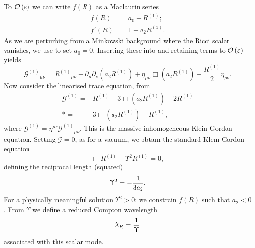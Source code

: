 To $\mathcal{O}\left({\varepsilon}\right)$ we can write $f(R)$ as a Maclaurin series
\begin{subequations}
\begin{align}
f(R) = {} & a_0 + R^{(1)}; \\
f'(R) = {} & 1 + a_2 R^{(1)}.
\end{align}
\end{subequations}
As we are perturbing from a Minkowski background where the Ricci scalar vanishes, we use  to set $a_0 = 0$. Inserting these into  and retaining terms to $\mathcal{O}\left({\varepsilon}\right)$ yields
\begin{equation}
{\mathcal{G}^{(1)}}_{\mu\nu} = {R^{(1)}}_{\mu\nu} - \partial_\mu\partial_\nu(a_2 R^{(1)}) + \eta_{\mu\nu}\Box(a_2 R^{(1)}) - \dfrac{R^{(1)}}{2}\eta_{\mu\nu}.
\label{eq:Field}
\end{equation}
Now consider the linearised trace equation, from 
\begin{align}
\mathcal{G}^{(1)} = {} & R^{(1)} + 3 \Box(a_2 R^{(1)}) - 2 R^{(1)} \nonumber \\*
 = {} & 3 \Box(a_2 R^{(1)}) - R^{(1)},
\label{eq:Box_R}
\end{align}
where $\mathcal{G}^{(1)} = \eta^{\mu\nu}{\mathcal{G}^{(1)}}_{\mu\nu}$. This is the massive inhomogeneous Klein-Gordon equation. Setting $\mathcal{G} = 0$, as for a vacuum, we obtain the standard Klein-Gordon equation
\begin{equation}
\Box R^{(1)} + \Upsilon^2 R^{(1)} = 0,
\end{equation}
defining the reciprocal length (squared)
\begin{equation}
\Upsilon^2 = -\dfrac{1}{3a_2}.
\end{equation}
For a physically meaningful solution $\Upsilon^2 > 0$: we constrain $f(R)$ such that $a_2 < 0$ \citep{Schmidt1986, Teyssandier1990, Olmo2005c, Corda2008}. From $\Upsilon$ we define a reduced Compton wavelength
\begin{equation}
\lambdabar_R = \recip{\Upsilon}
\end{equation}
associated with this scalar mode.

